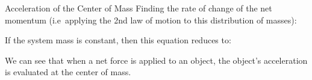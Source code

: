 \documentclass[12pt,compress,aspectratio=169]{beamer}
\begin{document}
\begin{frame}{Acceleration of the Center of Mass}
  Finding the rate of change of the net momentum (i.e\ applying the 2nd law of
  motion to this distribution of masses):
  

  If the system mass is constant, then this equation reduces to:

  
  We can see that when a net force is applied to an object, the object's
  acceleration is evaluated at the center of mass.
\end{frame}


\end{document}
